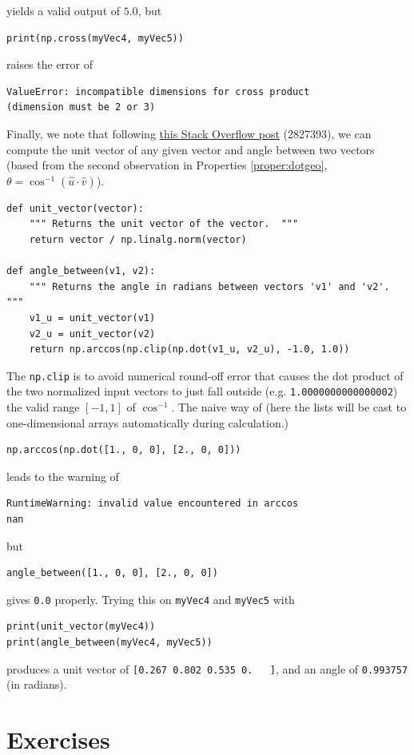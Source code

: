 yields a valid output of $5.0$, but
\begin{lstlisting}
print(np.cross(myVec4, myVec5))
\end{lstlisting}
raises the error of
\begin{lstlisting}
ValueError: incompatible dimensions for cross product
(dimension must be 2 or 3)    
\end{lstlisting}
Finally, we note that following \href{https://stackoverflow.com/questions/2827393/angles-between-two-n-dimensional-vectors-in-python}{this Stack Overflow post} (2827393), we can compute the unit vector of any given vector and angle between two vectors (based from the second observation in Properties \ref{proper:dotgeo}, $\theta = \cos^{-1}(\hat{u} \cdot \hat{v})$).
\begin{lstlisting}
def unit_vector(vector):
    """ Returns the unit vector of the vector.  """
    return vector / np.linalg.norm(vector)

def angle_between(v1, v2):
    """ Returns the angle in radians between vectors 'v1' and 'v2'. """
    v1_u = unit_vector(v1)
    v2_u = unit_vector(v2)
    return np.arccos(np.clip(np.dot(v1_u, v2_u), -1.0, 1.0))    
\end{lstlisting}
The \verb|np.clip| is to avoid numerical round-off error that causes the dot product of the two normalized input vectors to just fall outside (e.g. \verb|1.0000000000000002|) the valid range $[-1, 1]$ of $\cos^{-1}$. The naive way of (here the lists will be cast to one-dimensional arrays automatically during calculation.) 
\begin{lstlisting}
np.arccos(np.dot([1., 0, 0], [2., 0, 0]))
\end{lstlisting}
leads to the warning of
\begin{lstlisting}
RuntimeWarning: invalid value encountered in arccos  
nan
\end{lstlisting}
but
\begin{lstlisting}
angle_between([1., 0, 0], [2., 0, 0])
\end{lstlisting}
gives \verb|0.0| properly. Trying this on \verb|myVec4| and \verb|myVec5| with
\begin{lstlisting}
print(unit_vector(myVec4))
print(angle_between(myVec4, myVec5))
\end{lstlisting}
produces a unit vector of \verb|[0.267 0.802 0.535 0.   ]|, and an angle of \verb|0.993757| (in radians).

\section{Exercises}


